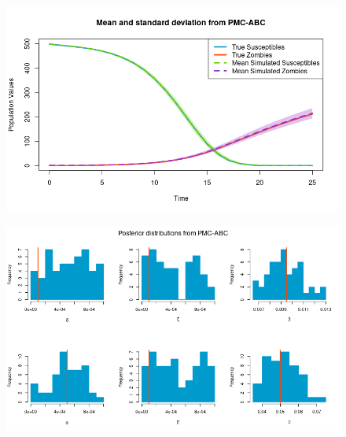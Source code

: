 \documentclass[]{article}
\begin{document}
\begin{figure}[H]
	\centering
	\includegraphics[width=0.8\linewidth]{../Figures/PMC_ABC_sd_bands}
\end{figure}

\begin{figure}[H]
	\centering
	\includegraphics[width=1\linewidth]{../Figures/PMC_posteriors}
\end{figure}



\end{document}
